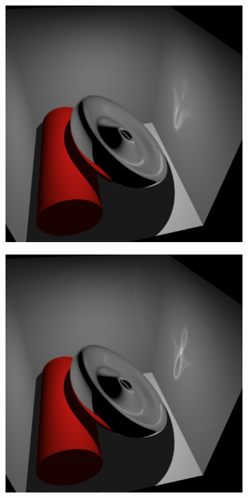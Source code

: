 \begin{figure}\label{f:photon-differentials-rendering}
\begin{center}
	\begin{subfigure}[b]{0.48\textwidth}
		\includegraphics[width=1.0\textwidth]{graphics/pm/pm-12-1}
	\end{subfigure}
	\begin{subfigure}[b]{0.48\textwidth}
		\includegraphics[width=1.0\textwidth]{graphics/pm/pm-12-2}

\end{subfigure}
\end{center}
\end{figure}
